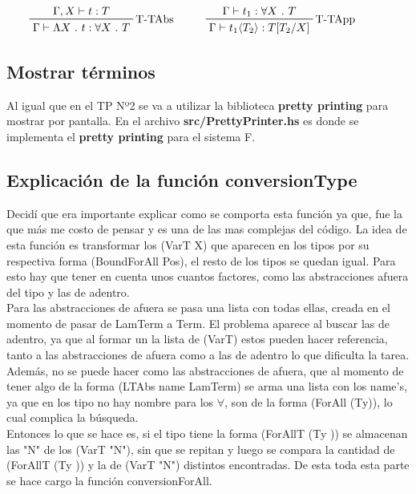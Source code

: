 \documentclass[12pt, titlepage, a4paper]{article}
\begin{document}
\begin{displaymath}
    \prftree[r]{T-TAbs}{\Gamma, X \vdash t : T}{\Gamma \vdash \Lambda X \ . \ t : \forall X \ . \ T} \hspace{1cm}
    \prftree[r]{T-TApp}{\Gamma \vdash t_1 : \forall X \ . \ T}{\Gamma \vdash t_1 \langle T_2 \rangle : T[T_2/X]} \hspace{1cm}
\end{displaymath}

\subsection{Mostrar términos}
Al igual que en el TP Nº2 \cite{tp2:lambdaCalculoSimpleTipado} se va a utilizar la biblioteca \textbf{pretty printing} para mostrar por 
pantalla. En el archivo
\textbf{src/PrettyPrinter.hs} es donde se implementa el \textbf{pretty printing} para el sistema F.

\subsection{Explicación de la función conversionType}
Decidí que era importante explicar como se comporta esta función ya que, fue la que más me costo de pensar y es una de las mas complejas del código.
La idea de esta función es transformar los (VarT X) que aparecen en los tipos por su respectiva forma (BoundForAll Pos), el resto de los tipos se 
quedan igual. Para esto hay que tener en cuenta unos cuantos factores, como las  
abstracciones afuera del tipo y las de adentro. \\

Para las abstracciones de afuera se pasa una lista con todas ellas, creada en el momento de pasar de LamTerm a Term.
El problema aparece al buscar las de adentro, ya que al formar un la lista de (VarT) estos pueden hacer referencia, tanto a las abstracciones de afuera como a las 
de adentro lo que dificulta la tarea. Además, no se puede hacer como las abstracciones de afuera, que al momento de tener algo de la forma 
(LTAbs name LamTerm) se arma una lista con los name's, ya que en los tipo no hay nombre para los $\forall$, son de la forma  (ForAll (Ty)), 
lo cual complica la búsqueda.\\  

Entonces lo que se hace es, si el tipo tiene la forma (ForAllT (Ty )) se almacenan las "N" de los (VarT "N"), sin que se repitan y luego se compara 
la cantidad de (ForAllT (Ty )) y la de (VarT "N") distintos encontradas. De esta toda esta parte se hace cargo la función conversionForAll. \\
\end{document}
